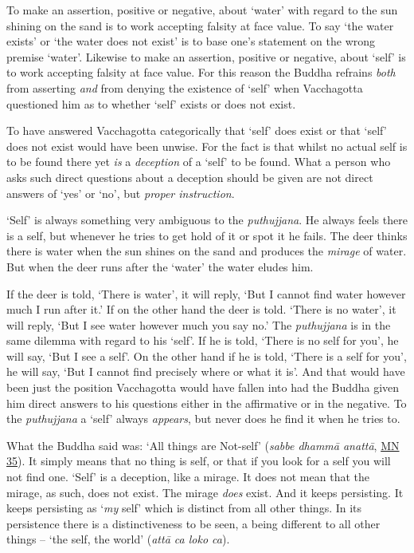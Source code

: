To make an assertion, positive or negative, about `water' with regard to the sun shining on the sand is to work accepting falsity at face value. To say `the water exists' or `the water does not exist' is to base one's statement on the wrong premise `water'. Likewise to make an assertion, positive or negative, about `self' is to work accepting falsity at face value. For this reason the Buddha refrains \emph{both} from asserting \emph{and} from denying the existence of `self' when Vacchagotta questioned him as to whether `self' exists or does not exist.

To have answered Vacchagotta categorically that `self' does exist or that `self' does not exist would have been unwise. For the fact is that whilst no actual self is to be found there yet \emph{is} a \emph{deception} of a `self' to be found. What a person who asks such direct questions about a deception should be given are not direct answers of `yes' or `no', but \emph{proper instruction}.

`Self' is always something very ambiguous to the \textit{puthujjana}. He always feels there is a self, but whenever he tries to get hold of it or spot it he fails. The deer thinks there is water when the sun shines on the sand and produces the \emph{mirage} of water. But when the deer runs after the `water' the water eludes him.

If the deer is told, `There is water', it will reply, `But I cannot find water however much I run after it.' If on the other hand the deer is told. `There is no water', it will reply, `But I see water however much you say no.' The \textit{puthujjana} is in the same dilemma with regard to his `self'. If he is told, `There is no self for you', he will say, `But I see a self'. On the other hand if he is told, `There is a self for you', he will say, `But I cannot find precisely where or what it is'. And that would have been just the position Vacchagotta would have fallen into had the Buddha given him direct answers to his questions either in the affirmative or in the negative. To the \textit{puthujjana} a `self' always \emph{appears}, but never does he find it when he tries to.

What the Buddha said was: `All things are Not-self' (\textit{sabbe dhammā anattā}, \href{https://suttacentral.net/mn35/en/sujato}{MN 35}). It simply means that no thing is self, or that if you look for a self you will not find one. `Self' is a deception, like a mirage. It does not mean that the mirage, as such, does not exist. The mirage \emph{does} exist. And it keeps persisting. It keeps persisting as `\emph{my} self' which is distinct from all other things. In its persistence there is a distinctiveness to be seen, a being different to all other things -- `the self, the world' (\textit{attā ca loko ca}).


